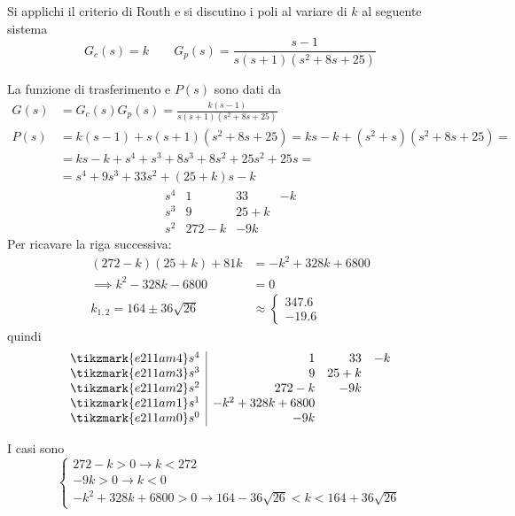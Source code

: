 \begin{esercizio}[Parametrico] Si applichi il criterio di Routh e si discutino i
poli al variare di \(k\) al seguente sistema
\[
	G_c(s) = k \qquad G_p(s) = \frac{s-1}{s (s+1) (s^2 +8s +25)}
\]

La funzione di trasferimento e \(P(s)\) sono dati da
\begin{align*}
	G(s) &= G_c(s) G_p(s) = \frac{k(s-1)}{s (s+1) (s^2 +8s +25)} \\
	P(s) &= k(s-1) + s (s+1) (s^2 +8s +25) = ks -k +(s^2 +s)(s^2 +8s +25) = \\
	     &= ks -k +s^4 +s^3 +8s^3 +8s^2 +25s^2 +25s = \\
	     &= s^4 +9s^3 +33s^2 +(25+k)s -k
\end{align*}
\[\begin{array}{r|rrr}
	s^4 & 1 & 33 & -k \\
	s^3 & 9 & 25+k \\
	s^2 & 272-k & -9k
\end{array}\]
Per ricavare la riga successiva:
\begin{align*}
	(272-k)(25+k) + 81k &= -k^2 +328k +6800 \\
	\implies k^2 -328k -6800 &= 0\\
	k_{1,2} = 164 \pm 36\sqrt{26} &\approx \begin{cases} 347.6 \\ -19.6 \end{cases}
\end{align*}
quindi
\[\begin{array}{r|rrr}
	\tikzmark{e211am4} s^4 & 1 & 33 & -k 	\\
	\tikzmark{e211am3} s^3 & 9 & 25+k 		\\
	\tikzmark{e211am2} s^2 & 272-k & -9k	\\
	\tikzmark{e211am1} s^1 & -k^2 +328k +6800	\\
	\tikzmark{e211am0} s^0 & -9k
\end{array}\]
I casi sono
\[\begin{cases}
	272-k > 0 \rightarrow k < 272 \\
	-9k > 0 \rightarrow k < 0 \\
	-k^2 +328k +6800 > 0 \rightarrow 164 -36\sqrt{26} < k < 164 +36\sqrt{26}
\end{cases}\]


\end{esercizio}
